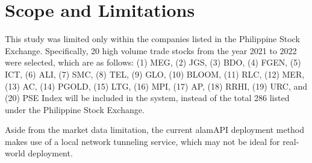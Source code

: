\section{Scope and Limitations}
\label{sec:scope}
This study was limited only within the companies listed in the 
Philippine Stock Exchange. Specifically, 20 high volume trade stocks from the year 2021 to 2022 
were selected, which are as follows: (1) MEG, (2) JGS, (3) BDO, (4) FGEN, 
(5) ICT, (6) ALI, (7) SMC, (8) TEL, (9) GLO, (10) BLOOM, (11) RLC, (12) MER, 
(13) AC, (14) PGOLD, (15) LTG, (16) MPI, (17) AP, (18) RRHI, (19) URC, and 
(20) PSE Index will be included in the system, instead of the total 286 listed
under the Philippine Stock Exchange.

Aside from the market data limitation, the current alamAPI deployment method makes use of a 
local network tunneling service, which may not be ideal for real-world deployment.